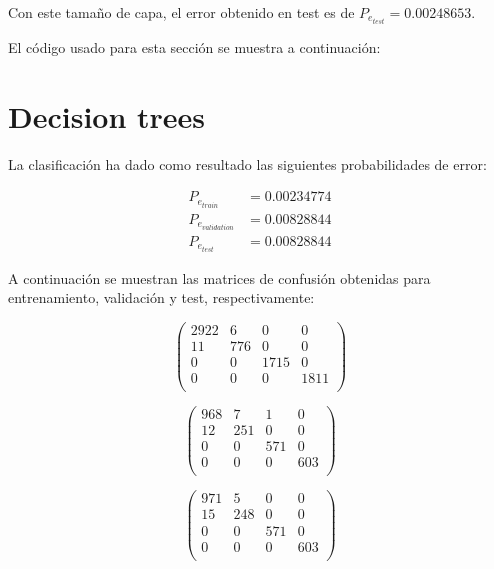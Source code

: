 \documentclass[11pt]{article} %
\begin{document}
Con este tamaño de capa, el error obtenido en test es de $P_{e_{test}} = 0.00248653$.

El código usado para esta sección se muestra a continuación:



\newpage

\section{Decision trees}

La clasificación ha dado como resultado las siguientes probabilidades de error:

\begin{align}
P_{e_{train}} &= 0.00234774 \\
P_{e_{validation}} &= 0.00828844 \\
P_{e_{test}} &= 0.00828844
\end{align}

A continuación se muestran las matrices de confusión obtenidas para entrenamiento, validación y test, respectivamente:

\begin{equation} \label{eq:tree:train}
\left( \begin{array}{cccc}
2922 &   6 &    0 &    0 \\
11 & 776 &    0 &    0 \\
0 &   0 & 1715 &    0 \\
0 &   0 &    0 & 1811 \\ 
\end{array} \right)
\end{equation}

\begin{equation} \label{eq:tree:validation}
\left( \begin{array}{cccc}
968 &   7 &   1 &   0 \\
12 & 251 &   0 &   0 \\
0 &   0 & 571 &   0 \\
0 &   0 &   0 & 603 \\
\end{array} \right)
\end{equation}

\begin{equation} \label{eq:tree:test}
\left( \begin{array}{cccc}
971 &   5 &   0 &   0 \\
15 & 248 &   0 &   0 \\
0 &   0 & 571 &   0 \\
0 &   0 &   0 & 603 \\
\end{array} \right)
\end{equation}
\end{document}
